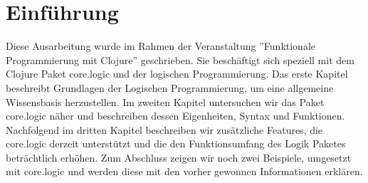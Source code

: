 \section{Einführung}
Diese Ausarbeitung wurde im Rahmen der Veranstaltung ''Funktionale Programmierung mit Clojure'' geschrieben. Sie beschäftigt sich speziell mit dem Clojure Paket core.logic und der logischen Programmierung. Das erste Kapitel beschreibt Grundlagen der Logischen Programmierung, um eine allgemeine Wissensbasis herzustellen. Im zweiten Kapitel untersuchen wir das Paket core.logic näher und beschreiben dessen Eigenheiten, Syntax und Funktionen.
Nachfolgend im dritten Kapitel beschreiben wir zusätzliche Features, die core.logic derzeit unterstützt und die den Funktionsumfang des Logik Paketes beträchtlich erhöhen.
Zum Abschluss zeigen wir noch zwei Beispiele, umgesetzt mit core.logic und werden diese mit den vorher gewonnen Informationen erklären.
